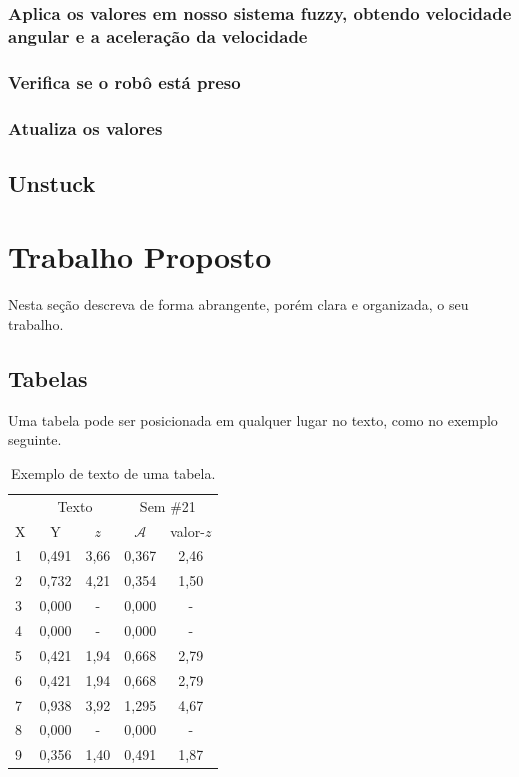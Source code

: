 \documentclass[twoside,conference,a4paper]{IEEEtran}
\begin{document}
  \subsubsection{Aplica os valores em nosso sistema fuzzy, obtendo velocidade angular e a aceleração da velocidade}
  \subsubsection{Verifica se o robô está preso}
  \subsubsection{Atualiza os valores}


\subsection{Unstuck}

\section{Trabalho Proposto}

Nesta seção descreva de forma abrangente, porém clara e organizada, o seu trabalho.

\subsection{Tabelas}

Uma tabela pode ser posicionada em qualquer lugar no texto, como no exemplo
seguinte.
%
\begin{table}[ht]
\renewcommand{\arraystretch}{1.3}
\centering
 \caption{Exemplo de texto de uma tabela.}
 \label{tab:tab1}
 \begin{tabular}{lcccc}\hline
  & \multicolumn{2}{c}{Texto}
  & \multicolumn{2}{c}{Sem \#21} \\ \cline{2-5}
  X & Y & $z$ & $\mathcal{A}$ & valor-$z$ \\ \hline \hline
  1      &0,491  & 3,66   &0,367 &2,46  \\
  2    &0,732  & 4,21   &0,354 &1,50  \\
  3      &0,000  & -      &0,000 & -    \\
  4      &0,000  & -      &0,000 & -  \\
  5      &0,421  & 1,94   &0,668 &2,79  \\
  6      &0,421  & 1,94   &0,668 &2,79  \\
  7      &0,938  & 3,92   &1,295 &4,67 \\
  8       &0,000  & -      &0,000 & - \\
  9       &0,356  & 1,40   &0,491 &1,87 \\ \hline
 \end{tabular}
\end{table}
\end{document}
